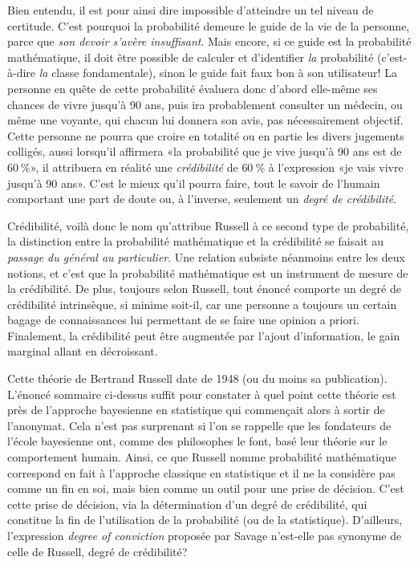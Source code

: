 Bien entendu, il est pour ainsi dire impossible d'atteindre un tel
niveau de certitude. C'est pourquoi la probabilité demeure le guide de
la vie de la personne, parce que \emph{son devoir s'avère
  insuffisant}. Mais encore, si ce guide est la probabilité
mathématique, il doit être possible de calculer et d'identifier
\emph{la} probabilité (c'est-à-dire \emph{la} classe fondamentale),
sinon le guide fait faux bon à son utilisateur! La personne en quête
de cette probabilité évaluera donc d'abord elle-même ses chances de
vivre jusqu'à 90 ans, puis ira probablement consulter un médecin, ou
même une voyante, qui chacun lui donnera son avis, pas nécessairement
objectif. Cette personne ne pourra que croire en totalité ou en partie
les divers jugements colligés, aussi lorsqu'il affirmera «la
probabilité que je vive jusqu'à 90 ans est de $60~\%$», il attribuera
en réalité une \emph{crédibilité} de $60~\%$ à l'expression «je vais
vivre jusqu'à 90 ans». C'est le mieux qu'il pourra faire, tout le
savoir de l'humain comportant une part de doute ou, à
l'inverse, seulement un \emph{degré de crédibilité}.

Crédibilité, voilà donc le nom qu'attribue Russell à ce second type de
probabilité, la distinction entre la probabilité mathématique et la
crédibilité se faisait au \emph{passage du général au particulier}.
Une relation subsiste néanmoins entre les deux notions, et c'est que
la probabilité mathématique est un instrument de mesure de la
crédibilité. De plus, toujours selon Russell, tout énoncé comporte un
degré de crédibilité intrinsèque, si minime soit-il, car une personne
a toujours un certain bagage de connaissances lui permettant de se
faire une opinion a priori. Finalement, la crédibilité peut être
augmentée par l'ajout d'information, le gain marginal allant en
décroissant.

Cette théorie de Bertrand Russell date de 1948 (ou du moins sa
publication). L'énoncé sommaire ci-dessus suffit pour constater à quel
point cette théorie est près de l'approche bayesienne en statistique
qui commençait alors à sortir de l'anonymat. Cela n'est pas surprenant
si l'on se rappelle que les fondateurs de l'école bayesienne ont,
comme des philosophes le font, basé leur théorie sur le comportement
humain. Ainsi, ce que Russell nomme probabilité mathématique correspond
en fait à l'approche classique en statistique et il ne la considère
pas comme un fin en soi, mais bien comme un outil pour une prise de
décision. C'est cette prise de décision, via la détermination d'un
degré de crédibilité, qui constitue la fin de l'utilisation de la
probabilité (ou de la statistique). D'ailleurs, l'expression
\emph{degree of conviction} proposée par Savage n'est-elle pas
synonyme de celle de Russell, degré de crédibilité?

